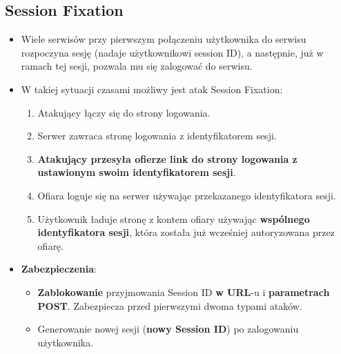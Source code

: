 \documentclass[../main.tex]{subfiles}
\begin{document}
    \subsection{Session Fixation}
    \begin{itemize}
        \item Wiele serwisów przy pierwszym połączeniu użytkownika do serwisu
        rozpoczyna sesję (nadaje użytkownikowi session ID), a następnie, już w
        ramach tej sesji, pozwala mu się zalogować do serwisu.
        \item W takiej sytuacji czasami możliwy jest atak Session Fixation:
        \begin{enumerate}
            \item Atakujący łączy się do strony logowania.
            \item Serwer zawraca stronę logowania z identyfikatorem sesji.
            \item \textbf{Atakujący przesyła ofierze link do strony logowania z ustawionym swoim identyfikatorem sesji}.
            \item Ofiara loguje się na serwer używając przekazanego identyfikatora sesji.
            \item Użytkownik ładuje stronę z kontem ofiary używając \textbf{wspólnego identyfikatora
            sesji}, która została już wcześniej autoryzowana przez ofiarę.
        \end{enumerate}
        \item \textbf{Zabezpieczenia}:
        \begin{itemize}
            \item \textbf{Zablokowanie} przyjmowania Session ID \textbf{w URL}-u i \textbf{parametrach POST}.
            Zabezpiecza przed pierwszymi dwoma typami ataków.
            \item Generowanie nowej sesji (\textbf{nowy Session ID}) po zalogowaniu użytkownika.
        \end{itemize}
    \end{itemize}
\end{document}

